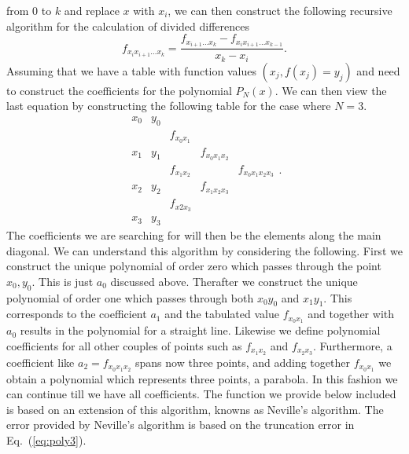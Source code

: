 from $0$ to $k$ and replace $x$ with $x_i$, we can then construct the following recursive
algorithm for the calculation of divided differences
\[
   f_{x_ix_{i+1}\dots x_k}=\frac{f_{x_{i+1}\dots x_k}-f_{x_ix_{i+1}\dots x_{k-1}}}{x_k-x_i}.
\]
Assuming that we have a table with function values $(x_j, f(x_j)=y_j)$ and need to construct
the coefficients for the polynomial $P_N(x)$. We can then view the last equation
by constructing the following table for the case where $N=3$.
\[
      \begin{array}{cccccc} x_0&y_0  &          &  & \\
                              &      &f_{x_0x_1}  &  &  \\
                            x_1&y_1  &          & f_{x_0x_1x_2} &  \\
                              &      &f_{x_1x_2}  &  &f_{x_0x_1x_2x_3}  \\
                            x_2&y_2  &  & f_{x_1x_2x_3} &  \\
                              &      &f_{x2x_3}  &  &  \\
                            x_3&y_3  &  & \end{array}.
\]
The coefficients we are searching for will then be the elements along the main diagonal.
We can understand this algorithm by considering the following. First we construct 
the unique polynomial of order zero which passes through the point $x_0,y_0$. This is just
$a_0$ discussed above. Therafter we construct the unique polynomial of order one
which passes through both $x_0y_0$ and $x_1y_1$. This corresponds to the coefficient 
$a_1$ and the tabulated value $f_{x_0x_1}$ and together with $a_0$ results in the polynomial
for a 
straight line. Likewise we define polynomial coefficients for all other couples of points
such as    $f_{x_1x_2}$ and $f_{x_2x_3}$. Furthermore, a coefficient like $a_2=f_{x_0x_1x_2}$
spans now three points, and adding together $f_{x_0x_1}$ we obtain a polynomial
which represents three points, a parabola. In this fashion we can continue
till we have all coefficients. The function we provide below included is based
on an extension of this algorithm, knowns as Neville's algorithm. 
The error provided by Neville's algorithm 
is based on the truncation error in Eq.~(\ref{eq:poly3}).
